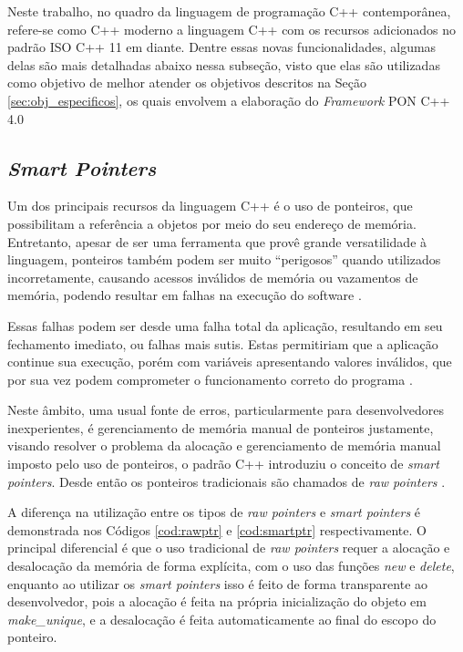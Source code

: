 Neste trabalho, no quadro da linguagem de programação C++ contemporânea,
refere-se como C++ moderno a linguagem C++ com os recursos adicionados no padrão
ISO C++ 11 em diante. Dentre essas novas funcionalidades, algumas delas são mais
detalhadas abaixo nessa subseção, visto que elas são utilizadas como objetivo de
melhor atender os objetivos descritos na Seção \ref{sec:obj_especificos}, os
quais envolvem a elaboração do \textit{Framework} PON C++ 4.0

\subsection{\textit{Smart Pointers}}

Um dos principais recursos da linguagem C++ é o uso de ponteiros, que
possibilitam a referência a objetos por meio do seu endereço de memória.
Entretanto, apesar de ser uma ferramenta que provê grande versatilidade à
linguagem, ponteiros também podem ser muito \enquote{perigosos} quando utilizados
incorretamente, causando acessos inválidos de memória ou vazamentos de memória,
podendo resultar em falhas na execução do software \cite{turner_2020}.

Essas falhas podem ser desde uma falha total da aplicação, resultando em seu
fechamento imediato, ou falhas mais sutis. Estas permitiriam que a aplicação
continue sua execução, porém com variáveis apresentando valores inválidos, que
por sua vez podem comprometer o funcionamento correto do programa \cite{modern_cpp}.

Neste âmbito, uma usual fonte de erros, particularmente para desenvolvedores
inexperientes, é gerenciamento de memória manual de ponteiros justamente,
visando resolver o problema da alocação e gerenciamento de memória manual
imposto pelo uso de ponteiros, o padrão C++ introduziu o conceito de
\textit{smart pointers}. Desde então os ponteiros tradicionais são chamados de
\textit{raw pointers} \cite{modern_cpp}.

A diferença na utilização entre os tipos de \textit{raw pointers} e
\textit{smart pointers} é demonstrada nos Códigos \ref{cod:rawptr} e
\ref{cod:smartptr} respectivamente. O principal diferencial é que o uso
tradicional de \textit{raw pointers} requer a alocação e desalocação da memória
de forma explícita, com o uso das funções \textit{new} e \textit{delete},
enquanto ao utilizar os \textit{smart pointers} isso é feito de forma
transparente ao desenvolvedor, pois a alocação é feita na própria inicialização
do objeto em \textit{make\_unique}, e a desalocação é feita automaticamente ao
final do escopo do ponteiro.

